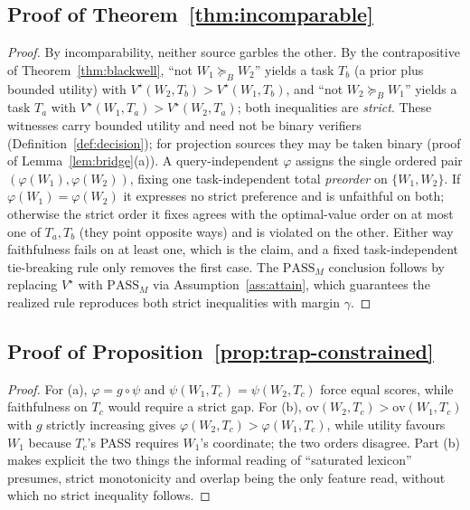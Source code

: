 \documentclass[11pt]{article}
\theoremstyle{plain}
\theoremstyle{definition}
\theoremstyle{remark}
\newcommand{\PASS}{\mathrm{PASS}}
\newcommand{\Bord}{\succeq_{B}}
\begin{document}
\subsection*{Proof of Theorem~\ref{thm:incomparable}}
\begin{proof}
By incomparability, neither source garbles the other. By the contrapositive of
Theorem~\ref{thm:blackwell}, ``not $W_1 \Bord W_2$'' yields a task $T_b$ (a prior plus bounded
utility) with $V^\star(W_2,T_b) > V^\star(W_1,T_b)$, and ``not $W_2 \Bord W_1$'' yields a task
$T_a$ with $V^\star(W_1,T_a) > V^\star(W_2,T_a)$; both inequalities are \emph{strict}. These witnesses carry bounded utility and need not be binary
verifiers (Definition~\ref{def:decision}); for projection sources they may be taken binary (proof
of Lemma~\ref{lem:bridge}\textup{(a)}). A query-independent $\varphi$ assigns the single ordered
pair $(\varphi(W_1), \varphi(W_2))$, fixing one task-independent total \emph{preorder} on
$\{W_1,W_2\}$. If $\varphi(W_1)=\varphi(W_2)$ it expresses no strict preference and is unfaithful
on both; otherwise the strict order it fixes agrees with the optimal-value order on at most one of
$T_a, T_b$ (they point opposite ways) and is violated on the other. Either way faithfulness fails
on at least one, which is the claim, and a fixed task-independent tie-breaking rule only removes
the first case. The $\PASS_M$ conclusion follows by replacing $V^\star$ with
$\PASS_M$ via Assumption~\ref{ass:attain}, which guarantees the realized rule reproduces both
strict inequalities with margin $\gamma$.
\end{proof}

\subsection*{Proof of Proposition~\ref{prop:trap-constrained}}
\begin{proof}
For (a), $\varphi=g\circ\psi$ and $\psi(W_1,T_c)=\psi(W_2,T_c)$ force equal scores, while
faithfulness on $T_c$ would require a strict gap. For (b), $\mathrm{ov}(W_2,T_c) >
\mathrm{ov}(W_1,T_c)$ with $g$ strictly increasing gives $\varphi(W_2,T_c) > \varphi(W_1,T_c)$,
while utility favours $W_1$ because $T_c$'s PASS requires $W_1$'s coordinate; the two orders
disagree. Part (b) makes
explicit the two things the informal reading of ``saturated lexicon'' presumes, strict monotonicity
and overlap being the only feature read, without which no strict inequality follows.
\end{proof}
\end{document}
